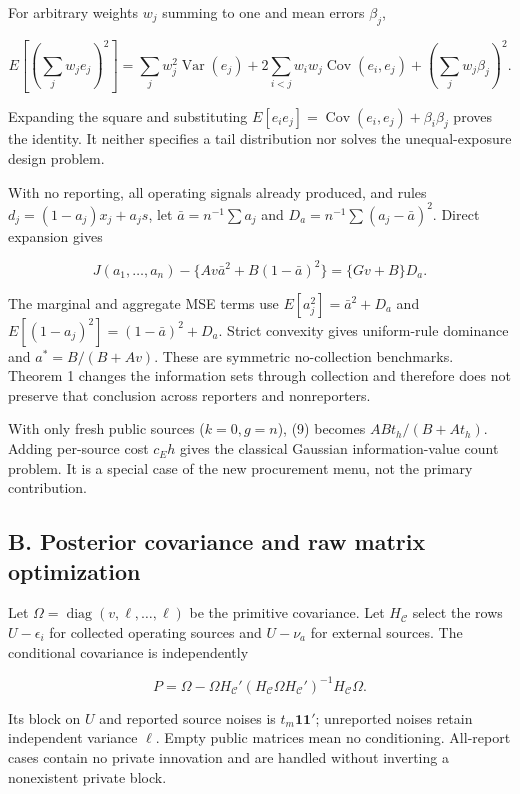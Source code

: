 \documentclass[
  11pt,
]{article}
\begin{document}
For arbitrary weights \(w_j\) summing to one and mean errors
\(\beta_j\),

\[E\left[\left(\sum_jw_je_j\right)^2\right]
=\sum_jw_j^2\operatorname{Var}(e_j)+2\sum_{i<j}w_iw_j\operatorname{Cov}(e_i,e_j)
+\left(\sum_jw_j\beta_j\right)^2.\]

Expanding the square and substituting
\(E[e_ie_j]=\operatorname{Cov}(e_i,e_j)+\beta_i\beta_j\) proves the
identity. It neither specifies a tail distribution nor solves the
unequal-exposure design problem.

With no reporting, all operating signals already produced, and rules
\(d_j=(1-a_j)x_j+a_js\), let \(\bar a=n^{-1}\sum a_j\) and
\(D_a=n^{-1}\sum(a_j-\bar a)^2\). Direct expansion gives

\[J(a_1,\ldots,a_n)-\{Av\bar a^2+B(1-\bar a)^2\}
=\{Gv+B\}D_a.\]

The marginal and aggregate MSE terms use \(E[a_j^2]=\bar a^2+D_a\) and
\(E[(1-a_j)^2]=(1-\bar a)^2+D_a\). Strict convexity gives uniform-rule
dominance and \(a^*=B/(B+Av)\). These are symmetric no-collection
benchmarks. Theorem 1 changes the information sets through collection
and therefore does not preserve that conclusion across reporters and
nonreporters.

With only fresh public sources (\(k=0,g=n\)), (9) becomes
\(ABt_h/(B+At_h)\). Adding per-source cost \(c_Eh\) gives the classical
Gaussian information-value count problem. It is a special case of the
new procurement menu, not the primary contribution.

\subsection{B. Posterior covariance and raw matrix
optimization}\label{b.-posterior-covariance-and-raw-matrix-optimization}

Let \(\Omega=\operatorname{diag}(v,\ell,\ldots,\ell)\) be the primitive
covariance. Let \(H_{\mathcal C}\) select the rows \(U-\epsilon_i\) for
collected operating sources and \(U-\nu_a\) for external sources. The
conditional covariance is independently

\[P=\Omega-\Omega H_{\mathcal C}'
(H_{\mathcal C}\Omega H_{\mathcal C}')^{-1}H_{\mathcal C}\Omega.\]

Its block on \(U\) and reported source noises is
\(t_m\mathbf1\mathbf1'\); unreported noises retain independent variance
\(\ell\). Empty public matrices mean no conditioning. All-report cases
contain no private innovation and are handled without inverting a
nonexistent private block.
\end{document}
